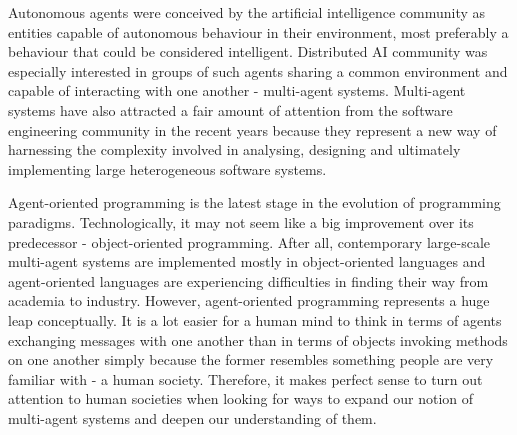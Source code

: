 


Autonomous agents were conceived by the artificial intelligence community as entities capable of autonomous behaviour in their environment, most preferably a behaviour that could be considered intelligent.
Distributed AI community was especially interested in groups of such agents sharing a common environment and capable of interacting with one another - multi-agent systems.
Multi-agent systems have also attracted a fair amount of attention from the software engineering community in the recent years because they represent a new way of harnessing the complexity involved in analysing, designing and ultimately implementing large heterogeneous software systems.
 
Agent-oriented programming is the latest stage in the evolution of programming paradigms.
Technologically, it may not seem like a big improvement over its predecessor - object-oriented programming.
After all, contemporary large-scale multi-agent systems are implemented mostly in object-oriented languages and agent-oriented languages are experiencing difficulties in finding their way from academia to industry.
However, agent-oriented programming represents a huge leap conceptually.
It is a lot easier for a human mind to think in terms of agents exchanging messages with one another than in terms of objects invoking methods on one another simply because the former resembles something people are very familiar with - a human society.
Therefore, it makes perfect sense to turn out attention to human societies when looking for ways to expand our notion of multi-agent systems and deepen our understanding of them.


